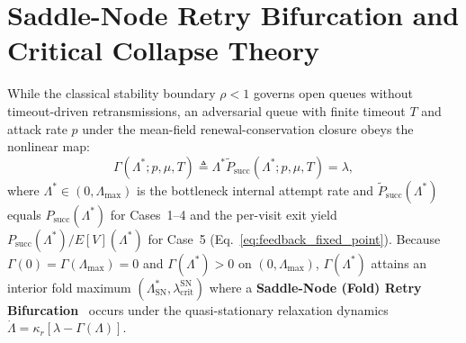 \documentclass[12pt,onecolumn]{article}
\begin{document}
\section{Saddle-Node Retry Bifurcation and Critical Collapse Theory}
\label{sec:bifurcation}
While the classical stability boundary $\rho < 1$ governs open queues without timeout-driven retransmissions, an adversarial queue with finite timeout $T$ and attack rate $p$ under the mean-field renewal-conservation closure obeys the nonlinear map:
\begin{equation}
\Gamma(\Lambda^*; p, \mu, T) \triangleq \Lambda^* \tilde{P}_{\text{succ}}(\Lambda^*; p, \mu, T) = \lambda,
\label{eq:conservation_map}
\end{equation}
where $\Lambda^* \in (0, \Lambda_{\max})$ is the bottleneck internal attempt rate and $\tilde{P}_{\text{succ}}(\Lambda^*)$ equals $P_{\text{succ}}(\Lambda^*)$ for Cases~1--4 and the per-visit exit yield $P_{\text{succ}}(\Lambda^*)/E[V](\Lambda^*)$ for Case~5 (Eq.~\ref{eq:feedback_fixed_point}). Because $\Gamma(0) = \Gamma(\Lambda_{\max}) = 0$ and $\Gamma(\Lambda^*) > 0$ on $(0, \Lambda_{\max})$, $\Gamma(\Lambda^*)$ attains an interior fold maximum $(\Lambda_{\text{SN}}^*, \lambda_{\text{crit}}^{\text{SN}})$ where a \textbf{Saddle-Node (Fold) Retry Bifurcation}~\cite{strogatz2015nonlinear} occurs under the quasi-stationary relaxation dynamics $\dot{\Lambda} = \kappa_r[\lambda - \Gamma(\Lambda)]$.
\end{document}
